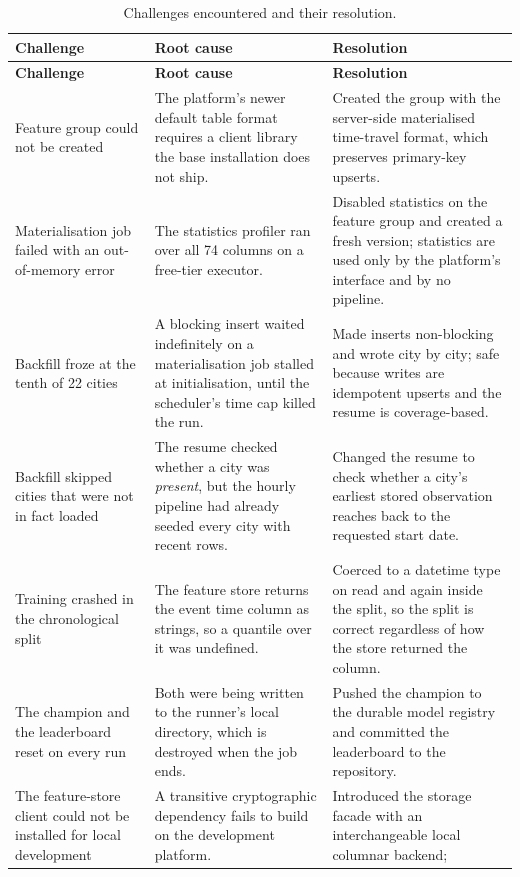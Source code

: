 \begin{xltabular}{\textwidth}{P{3.4cm} P{4.0cm} Y}
\caption{Challenges encountered and their resolution.}\label{tab:challenges}\\
\toprule
\bfseries Challenge & \bfseries Root cause & \bfseries Resolution \\
\midrule
\endfirsthead
\toprule
\bfseries Challenge & \bfseries Root cause & \bfseries Resolution \\
\midrule
\endhead
\bottomrule
\endlastfoot
Feature group could not be created & The platform's newer default table format
requires a client library the base installation does not ship. & Created the
group with the server-side materialised time-travel format, which preserves
primary-key upserts. \\
Materialisation job failed with an out-of-memory error & The statistics profiler
ran over all 74 columns on a free-tier executor. & Disabled statistics on the
feature group and created a fresh version; statistics are used only by the
platform's interface and by no pipeline. \\
Backfill froze at the tenth of 22 cities & A blocking insert waited indefinitely
on a materialisation job stalled at initialisation, until the scheduler's time cap
killed the run. & Made inserts non-blocking and wrote city by city; safe because
writes are idempotent upserts and the resume is coverage-based. \\
Backfill skipped cities that were not in fact loaded & The resume checked whether
a city was \emph{present}, but the hourly pipeline had already seeded every city
with recent rows. & Changed the resume to check whether a city's earliest stored
observation reaches back to the requested start date. \\
Training crashed in the chronological split & The feature store returns the event
time column as strings, so a quantile over it was undefined. & Coerced to a
datetime type on read and again inside the split, so the split is correct
regardless of how the store returned the column. \\
The champion and the leaderboard reset on every run & Both were being written to
the runner's local directory, which is destroyed when the job ends. & Pushed the
champion to the durable model registry and committed the leaderboard to the
repository. \\
The feature-store client could not be installed for local development & A
transitive cryptographic dependency fails to build on the development platform. &
Introduced the storage facade with an interchangeable local columnar backend;

\end{xltabular}
